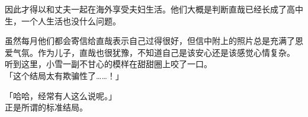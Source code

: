 因此才得以和丈夫一起在海外享受夫妇生活。他们大概是判断直哉已经长成了高中生，一个人生活也没什么问题。

虽然每月他们都会寄信给直哉表示自己过得很好，但信中附上的照片总是充满了恩爱气氛。作为儿子，直哉也很犹豫，不知道自己是该安心还是该感觉心情复杂。\\

听到这里，小雪一副不甘心的模样在甜甜圈上咬了一口。\\

「这个结局太有欺骗性了……！」

「哈哈，经常有人这么说呢。」\\

正是所谓的标准结局。
